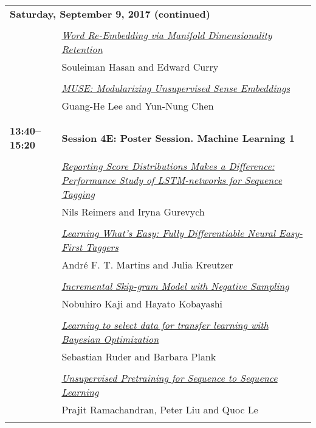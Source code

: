 \begin{tabular}{p{20mm}p{128mm}}
\\
\multicolumn{2}{l}{\bf Saturday, September 9, 2017 (continued)} \\\\
 & \hyperlink{page.321}{\em Word Re-Embedding via Manifold Dimensionality Retention}\\
         & Souleiman Hasan and Edward Curry \\
\\

 & \hyperlink{page.327}{\em MUSE: Modularizing Unsupervised Sense Embeddings}\\
         & Guang-He Lee and Yun-Nung Chen \\
\\

\\{\bf 13:40--15:20} & {\bf Session 4E: Poster Session. Machine Learning 1 } \\
\\
 & \hyperlink{page.338}{\em Reporting Score Distributions Makes a Difference: Performance Study of LSTM-networks for Sequence Tagging}\\
         & Nils Reimers and Iryna Gurevych \\
\\

 & \hyperlink{page.349}{\em Learning What's Easy: Fully Differentiable Neural Easy-First Taggers}\\
         & Andr\'{e} F. T. Martins and Julia Kreutzer \\
\\

 & \hyperlink{page.361}{\em Incremental Skip-gram Model with Negative Sampling}\\
         & Nobuhiro Kaji and Hayato Kobayashi \\
\\

 & \hyperlink{page.370}{\em Learning to select data for transfer learning with Bayesian Optimization}\\
         & Sebastian Ruder and Barbara Plank \\
\\

 & \hyperlink{page.381}{\em Unsupervised Pretraining for Sequence to Sequence Learning}\\
         & Prajit Ramachandran, Peter Liu and Quoc Le \\
\\


\end{tabular}
